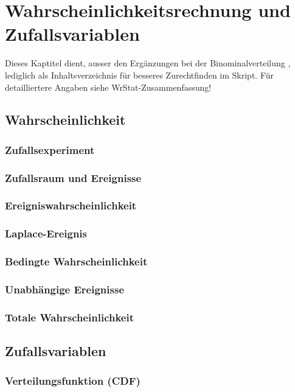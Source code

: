 \section{Wahrscheinlichkeitsrechnung und Zufallsvariablen }
Dieses Kaptitel dient, ausser den Ergänzungen bei der Binominalverteilung
 \normalsize, lediglich als Inhaltsverzeichnis für besseres
Zurechtfinden im Skript.
Für detailliertere Angaben siehe WrStat-Zusammenfassung!
\vspace{-0.3cm}
\subsection{Wahrscheinlichkeit }
\subsubsection{Zufallsexperiment }
\subsubsection{Zufallsraum und Ereignisse }
\subsubsection{Ereigniswahrscheinlichkeit }
\subsubsection{Laplace-Ereignis }
\subsubsection{Bedingte Wahrscheinlichkeit }
\subsubsection{Unabhängige Ereignisse }
\subsubsection{Totale Wahrscheinlichkeit }
\vspace{0.25cm}

\subsection{Zufallsvariablen }
\subsubsection{Verteilungsfunktion (CDF) }
